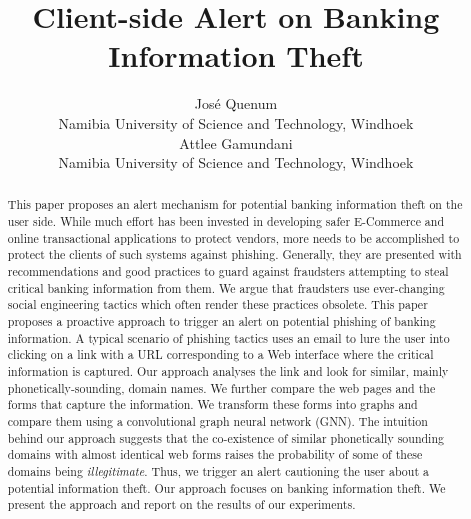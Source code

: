 \documentclass{article}
\title[Sub-title]{Client-side Alert on Banking Information Theft}
\author[Quenum and Gamundani]{%
  Jos\'{e} Quenum\\
Namibia University of Science and Technology, Windhoek\\
\email{jquenum@nust.na}\And
Attlee Gamundani\\
Namibia University of Science and Technology, Windhoek\\
\email{agamundani@nust.na}}
\begin{document}
\maketitle

\begin{abstract}
  This paper proposes an alert mechanism for potential banking information theft on the user side. While much effort has been invested in developing safer E-Commerce and online transactional applications to protect vendors, more needs to be accomplished to protect the clients of such systems against phishing. Generally, they are presented with recommendations and good practices to guard against fraudsters attempting to steal critical banking information from them. We argue that fraudsters use ever-changing social engineering tactics which often render these practices obsolete. This paper proposes a proactive approach to trigger an alert on potential phishing of banking information.  A typical scenario of phishing tactics uses an email to lure the user into clicking on a link with a URL corresponding to a Web interface where the critical information is captured. Our approach analyses the link and look for similar, mainly phonetically-sounding,  domain names. We further compare the web pages and the forms that capture the information. We transform these forms into graphs and compare them using a convolutional graph neural network (GNN). The intuition behind our approach suggests that the co-existence of similar phonetically sounding domains with almost identical web forms raises the probability of some of these domains being \emph{illegitimate}. Thus, we trigger an alert cautioning the user about a potential information theft. Our approach focuses on banking information theft. We present the approach and report on the results of our experiments.
\end{abstract}
\end{document}
